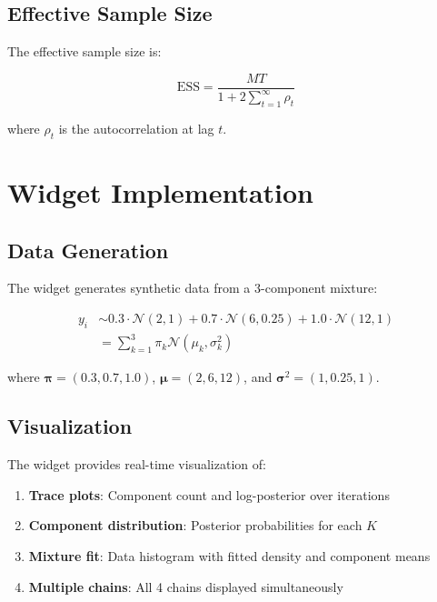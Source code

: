 \documentclass[12pt]{article}
\begin{document}
\subsection{Effective Sample Size}

The effective sample size is:

\begin{equation}
\text{ESS} = \frac{MT}{1 + 2\sum_{t=1}^{\infty} \rho_t}
\end{equation}

where $\rho_t$ is the autocorrelation at lag $t$.

\section{Widget Implementation}

\subsection{Data Generation}

The widget generates synthetic data from a 3-component mixture:

\begin{align}
y_i &\sim 0.3 \cdot \mathcal{N}(2, 1) + 0.7 \cdot \mathcal{N}(6, 0.25) + 1.0 \cdot \mathcal{N}(12, 1) \\
&= \sum_{k=1}^3 \pi_k \mathcal{N}(\mu_k, \sigma_k^2)
\end{align}

where $\boldsymbol{\pi} = (0.3, 0.7, 1.0)$, $\boldsymbol{\mu} = (2, 6, 12)$, and $\boldsymbol{\sigma}^2 = (1, 0.25, 1)$.

\subsection{Visualization}

The widget provides real-time visualization of:

\begin{enumerate}
\item \textbf{Trace plots}: Component count and log-posterior over iterations
\item \textbf{Component distribution}: Posterior probabilities for each $K$
\item \textbf{Mixture fit}: Data histogram with fitted density and component means
\item \textbf{Multiple chains}: All 4 chains displayed simultaneously
\end{enumerate}
\end{document}
